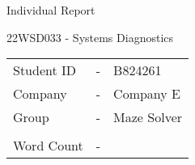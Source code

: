 
\vspace*{20mm}
\begin{center}
    \begin{Huge}
        Individual Report
    \end{Huge}

    \begin{huge}
        22WSD033 - Systems Diagnostics
    \end{huge}
\end{center}

\vspace*{30mm}

\begin{tabular}{lcl}
    Student ID  & -     & B824261       \\
    Company     & -     & Company E     \\
    Group       & -     & Maze Solver   \\
                &       &               \\
    Word Count  & -     &               \\  %
\end{tabular}

\vspace*{10mm}


